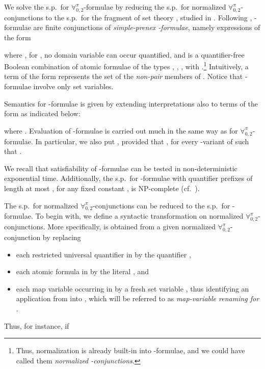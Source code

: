 \documentclass[submission,copyright,creativecommons]{eptcs}
\newcommand{\Lang}{\ensuremath{\mathbf{\forall}^{\pi}_{0,2}}\xspace}
\newcommand{\corr}[1]{#1}
\begin{document}
We solve the s.p.\ for \Lang-formulae by reducing the s.p.\ for
normalized \Lang-conjunctions to the s.p.\ for the fragment of set
theory \Forallpizero, studied in \cite{CanLonNic2011}.
Following \cite{CanLonNic2011},
\Forallpizero-formulae are finite conjunctions of \emph{simple-prenex
\Forallpizero-formulae}, namely expressions of the form

where , for , no domain
variable  can occur quantified, and  is a
quantifier-free Boolean combination of atomic formulae of the types
, , , 
with .\footnote{Thus, normalization is already
built-in into \Forallpizero-formulae, and we could have called them
\emph{normalized \Forallpizero-conjunctions}.}
Intuitively, a term of the form  represents the set of 
the \emph{non-pair} members of .
Notice that \Forallpizero-formulae involve only set variables.

Semantics for \Forallpizero-formulae is given by extending
interpretations also to terms of the form  as indicated
below:

where .
Evaluation of \Forallpizero-formulae is carried out much in the same
way as for \Lang-formulae.  In particular, we also put
, provided
  that , for every -variant 
  of  such that . 

We recall that satisfiability of \Forallpizero-formulae can be tested
in non-deterministic exponential time.  Additionally, the s.p.\ for
\Forallpizero-formulae with quantifier prefixes of length at most ,
for any fixed constant , is \textsc{NP}-complete (cf.\
\cite{CanLonNic2011}).

The s.p.\ for normalized \Lang-conjunctions can be reduced to the
s.p.\ for \Forallpizero-formulae.  To begin with, we define a
syntactic transformation  on normalized
\Lang-conjunctions.  More specifically,  is obtained
from a given normalized \Lang-conjunction  by replacing
\begin{itemize}
    \item each restricted universal quantifier  in
     \corr{by} the quantifier ,
    
    \item each atomic formula  in  \corr{by} the literal
    , and
    
    \item each map variable  occurring in  by a fresh
    set variable , thus identifying an application  from  into , 
    which will be referred to as \emph{\corr{map-variable renaming} for 
    }.
\end{itemize}    
Thus, for instance, if
\end{document}
